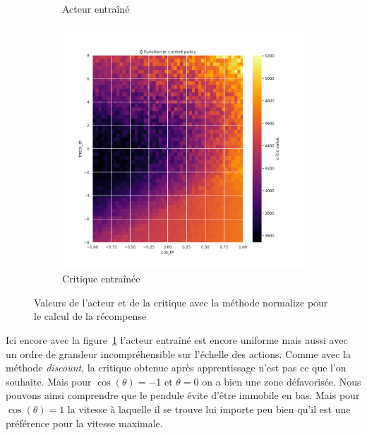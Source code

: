 \begin{figure}[H]
\begin{subfigure}{0.3\textwidth}
        \caption{Acteur entraîné}
    \end{subfigure}
    \begin{subfigure}{0.3\textwidth}
        \includegraphics[width=\textwidth]{figures/iteration2/0_critic_normalize_post_Pendulum-v0.pdf}
        \caption{Critique entraînée}
    \end{subfigure}
    \caption{Valeurs de l'acteur et de la critique avec la méthode normalize pour le calcul de la récompense}
    \label{fig:itr2_normalize}
\end{figure}

Ici encore avec la figure~\ref{fig:itr2_normalize} l'acteur entraîné est encore uniforme mais aussi avec un ordre de grandeur incompréhensible sur l'échelle des actions. Comme avec la méthode \emph{discount}, la critique obtenue après apprentissage n'est pas ce que l'on souhaite. Mais pour $\cos(\theta) = -1$ et $\dot{\theta} = 0$ on a bien une zone défavorisée. Nous pouvons ainsi comprendre que le pendule évite d'être immobile en bas. Mais pour $\cos(\theta) = 1$ la vitesse à laquelle il se trouve lui importe peu bien qu'il est une préférence pour la vitesse maximale.